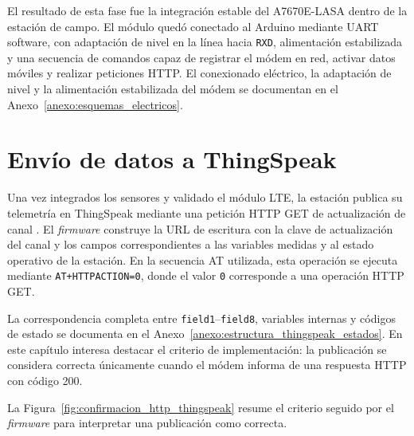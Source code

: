 El resultado de esta fase fue la integración estable del A7670E-LASA dentro de la estación de campo. El módulo quedó conectado al Arduino mediante UART software, con adaptación de nivel en la línea hacia \texttt{RXD}, alimentación estabilizada y una secuencia de comandos capaz de registrar el módem en red, activar datos móviles y realizar peticiones HTTP. El conexionado eléctrico, la adaptación de nivel y la alimentación estabilizada del módem se documentan en el Anexo~\ref{anexo:esquemas_electricos}.

\section{Envío de datos a ThingSpeak}
\label{sec:envio_datos_thingspeak}

Una vez integrados los sensores y validado el módulo LTE, la estación publica su telemetría en ThingSpeak mediante una petición HTTP GET de actualización de canal \cite{thingspeak_write_data}. El \textit{firmware} construye la URL de escritura con la clave de actualización del canal y los campos correspondientes a las variables medidas y al estado operativo de la estación. En la secuencia AT utilizada, esta operación se ejecuta mediante \texttt{AT+HTTPACTION=0}, donde el valor \texttt{0} corresponde a una operación HTTP GET.

La correspondencia completa entre \texttt{field1}--\texttt{field8}, variables internas y códigos de estado se documenta en el Anexo~\ref{anexo:estructura_thingspeak_estados}. En este capítulo interesa destacar el criterio de implementación: la publicación se considera correcta únicamente cuando el módem informa de una respuesta HTTP con código 200.

La Figura~\ref{fig:confirmacion_http_thingspeak} resume el criterio seguido por el \textit{firmware} para interpretar una publicación como correcta.

